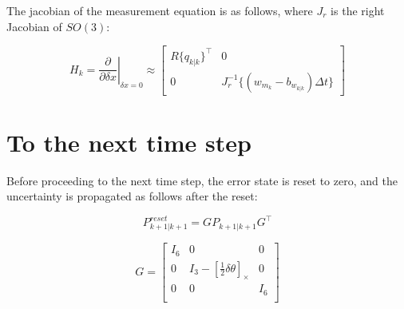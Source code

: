 \documentclass[]{article}
\newcommand*\eval[3]{\left.#1\right\rvert_{#2}^{#3}}
\begin{document}
The jacobian of the measurement equation is as follows, where $J_r$ is the right Jacobian of $SO(3)$:

\begin{equation}
H_k = 
\eval{\frac{\partial}{\partial \delta x}}{\delta x = 0}{} \approx
\begin{bmatrix}
R\{q_{k|k}\}^{\intercal} & 0 \\
                       0 & J_r^{-1}\{(w_{m_k}-b_{w_{k|k}}) \Delta t\}
\end{bmatrix}
\end{equation}

\section{To the next time step}
Before proceeding to the next time step, the error state is reset to zero, and the uncertainty is propagated as follows after the reset:

\begin{equation}P_{k+1|k+1}^{reset} = G P_{k+1|k+1} G^{\intercal}\end{equation} 

\begin{equation}G = 
\begin{bmatrix}
I_6  &    0                                        & 0   \\
  0  & I_3 - [\frac{1}{2} \delta \theta]_{\times}  & 0  \\
  0  &    0                                        & I_6  \\
\end{bmatrix}
\end{equation}
\end{document}
